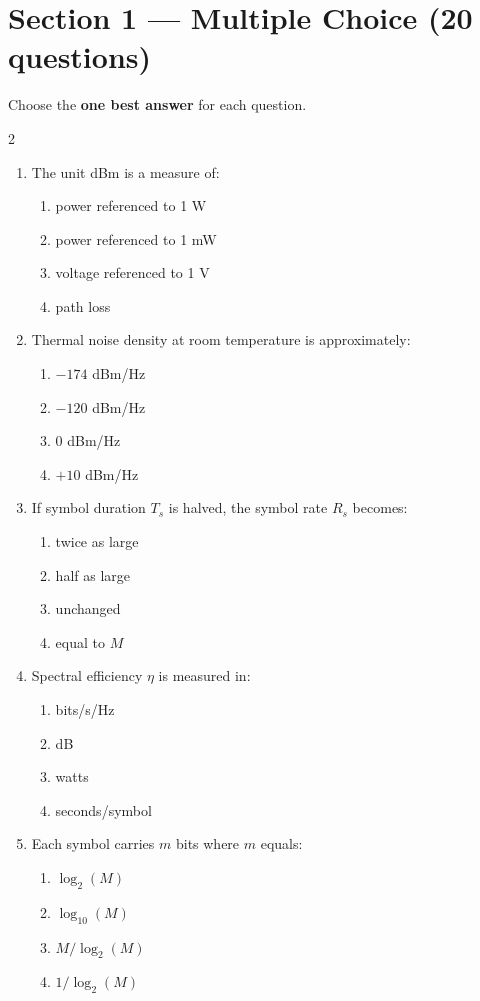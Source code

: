 \section*{Section 1 --- Multiple Choice (20 questions)}
Choose the \textbf{one best answer} for each question.

\vspace{0.3cm}
\begin{multicols}{2}
\begin{enumerate}[leftmargin=*, itemsep=0.4em]
\item The unit dBm is a measure of:
\begin{enumerate}[label=\alph*)]
\item power referenced to 1 W
\item power referenced to 1 mW
\item voltage referenced to 1 V
\item path loss
\end{enumerate}

\item Thermal noise density at room temperature is approximately:
\begin{enumerate}[label=\alph*)]
\item $-174$ dBm/Hz
\item $-120$ dBm/Hz
\item $0$ dBm/Hz
\item $+10$ dBm/Hz
\end{enumerate}

\item If symbol duration $T_s$ is halved, the symbol rate $R_s$ becomes:
\begin{enumerate}[label=\alph*)]
\item twice as large
\item half as large
\item unchanged
\item equal to $M$
\end{enumerate}

\item Spectral efficiency $\eta$ is measured in:
\begin{enumerate}[label=\alph*)]
\item bits/s/Hz
\item dB
\item watts
\item seconds/symbol
\end{enumerate}

\item Each symbol carries $m$ bits where $m$ equals:
\begin{enumerate}[label=\alph*)]
\item $\log_2(M)$
\item $\log_{10}(M)$
\item $M/\log_2(M)$
\item $1/\log_2(M)$
\end{enumerate}


\end{enumerate}
\end{multicols}
